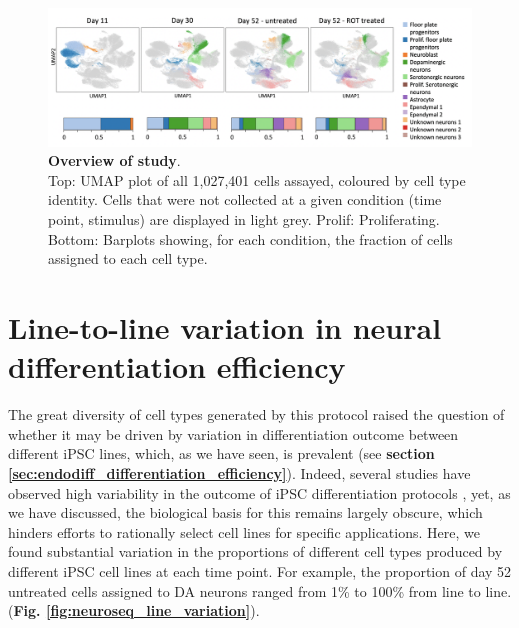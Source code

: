 \begin{figure}[h]
\centering
\includegraphics[width=17cm]{Chapter5/Fig/neuroseq_overview.png}
\caption[Overview of study]{\textbf{Overview of study}.\\
Top: UMAP plot of all 1,027,401 cells assayed, coloured by 
cell type identity. 
Cells that were not collected at a given condition (time point, stimulus) are displayed in light grey. 
Prolif: Proliferating. 
Bottom: Barplots showing, for each condition, the fraction of cells assigned to each cell type.}
\label{fig:neuroseq_overview}
\end{figure}


\newpage

\section{Line-to-line variation in neural differentiation efficiency}
\label{sec:neuroseq_diff_eff}

The great diversity of cell types generated by this protocol raised the question of whether it may be driven by variation in differentiation outcome between different iPSC lines, which, as we have seen, is prevalent (see \textbf{section \ref{sec:endodiff_differentiation_efficiency}}). 
Indeed, several studies have observed high variability in the outcome of iPSC differentiation protocols \cite{d2019association, volpato2018reproducibility}, yet, as we have discussed, the biological basis for this remains largely obscure, which hinders efforts to rationally select cell lines for specific applications. 
Here, we found substantial variation in the proportions of different cell types produced by different iPSC cell lines at each time point. 
For example, the proportion of day 52 untreated cells assigned to DA neurons ranged from 1\% to 100\% from line to line.
(\textbf{Fig. \ref{fig:neuroseq_line_variation}}).

